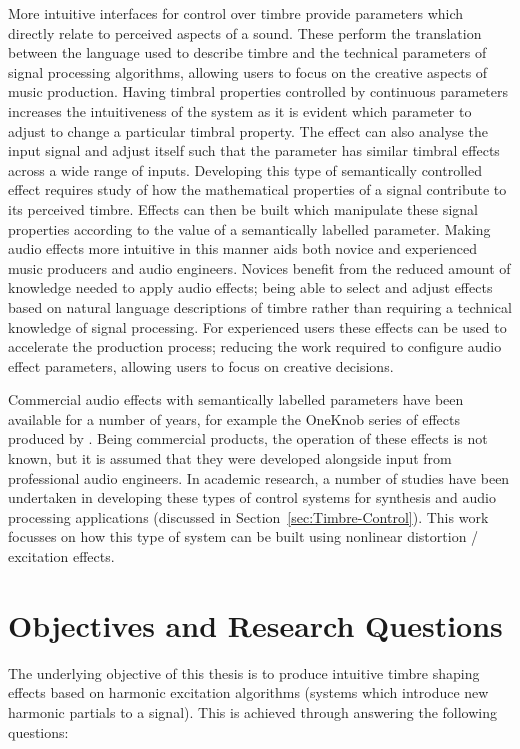 	More intuitive interfaces for control over timbre provide parameters which directly relate to perceived aspects of a
	sound. These perform the translation between the language used to describe timbre and the technical parameters of
	signal processing algorithms, allowing users to focus on the creative aspects of music production. Having timbral
	properties controlled by continuous parameters increases the intuitiveness of the system as it is evident which
	parameter to adjust to change a particular timbral property. The effect can also analyse the input signal and adjust
	itself such that the parameter has similar timbral effects across a wide range of inputs. Developing this type of
	semantically controlled effect requires study of how the mathematical properties of a signal contribute to its
	perceived timbre. Effects can then be built which manipulate these signal properties according to the value of a
	semantically labelled parameter. Making audio effects more intuitive in this manner aids both novice and experienced
	music producers and audio engineers. Novices benefit from the reduced amount of knowledge needed to apply audio
	effects; being able to select and adjust effects based on natural language descriptions of timbre rather than
	requiring a technical knowledge of signal processing. For experienced users these effects can be used to accelerate
	the production process; reducing the work required to configure audio effect parameters, allowing users to focus on
	creative decisions. 
	
	Commercial audio effects with semantically labelled parameters have been available for a number of years, for
	example the OneKnob series of effects produced by \citet{wavesoneknob}. Being commercial products, the operation of
	these effects is not known, but it is assumed that they were developed alongside input from professional audio
	engineers. In academic research, a number of studies have been undertaken in developing these types of control
	systems for synthesis and audio processing applications (discussed in Section~\ref{sec:Timbre-Control}). This work
	focusses on how this type of system can be built using nonlinear distortion / excitation effects.

\section{Objectives and Research Questions}
\label{sec:Introduction-Objectives}
	The underlying objective of this thesis is to produce intuitive timbre shaping effects based on harmonic excitation
	algorithms (systems which introduce new harmonic partials to a signal). This is achieved through answering the
	following questions:

